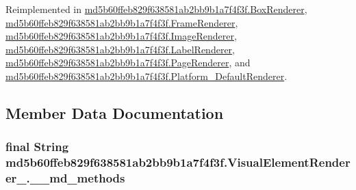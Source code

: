 Reimplemented in \hyperlink{classmd5b60ffeb829f638581ab2bb9b1a7f4f3f_1_1_box_renderer_7dbb553b416a3c1e05c3c31699665a75}{md5b60ffeb829f638581ab2bb9b1a7f4f3f.BoxRenderer}, \hyperlink{classmd5b60ffeb829f638581ab2bb9b1a7f4f3f_1_1_frame_renderer_86dff6d2f4926a6282df9c47cb59bbcf}{md5b60ffeb829f638581ab2bb9b1a7f4f3f.FrameRenderer}, \hyperlink{classmd5b60ffeb829f638581ab2bb9b1a7f4f3f_1_1_image_renderer_b69668a58532e4f57a389fa04e18015d}{md5b60ffeb829f638581ab2bb9b1a7f4f3f.ImageRenderer}, \hyperlink{classmd5b60ffeb829f638581ab2bb9b1a7f4f3f_1_1_label_renderer_364b8f793419ee7c9d991b140708c0b5}{md5b60ffeb829f638581ab2bb9b1a7f4f3f.LabelRenderer}, \hyperlink{classmd5b60ffeb829f638581ab2bb9b1a7f4f3f_1_1_page_renderer_83a5007f3a24de66ed291c422b3b2adf}{md5b60ffeb829f638581ab2bb9b1a7f4f3f.PageRenderer}, and \hyperlink{classmd5b60ffeb829f638581ab2bb9b1a7f4f3f_1_1_platform___default_renderer_07ccce17539adcbc1b97fbfc02107560}{md5b60ffeb829f638581ab2bb9b1a7f4f3f.Platform\_\-DefaultRenderer}.

\subsection{Member Data Documentation}
\hypertarget{classmd5b60ffeb829f638581ab2bb9b1a7f4f3f_1_1_visual_element_renderer__1_4ef182bc984a4330ed789e1f0b0222d1}{
\subsubsection[{\_\-\_\-md\_\-methods}]{\setlength{\rightskip}{0pt plus 5cm}final String {\bf md5b60ffeb829f638581ab2bb9b1a7f4f3f.VisualElementRenderer\_.\_\-\_\-md\_\-methods}}}
\label{classmd5b60ffeb829f638581ab2bb9b1a7f4f3f_1_1_visual_element_renderer__1_4ef182bc984a4330ed789e1f0b0222d1}




